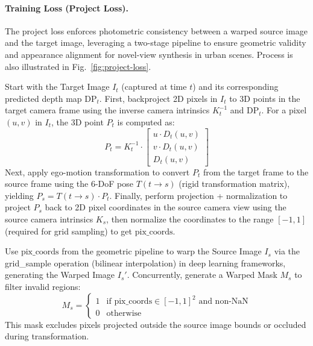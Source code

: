 \paragraph{Training Loss (Project Loss).}
The project loss enforces photometric consistency between a warped source image and the target image, leveraging a two-stage pipeline to ensure geometric validity and appearance alignment for novel-view synthesis in urban scenes. Process is also illustrated in Fig.~\ref{fig:project-loss}.

Start with the Target Image \( I_t \) (captured at time \( t \)) and its corresponding predicted depth map \( \text{DP}_t \). First, backproject 2D pixels in \( I_t \) to 3D points in the target camera frame using the inverse camera intrinsics \( K_t^{-1} \) and \( \text{DP}_t \). For a pixel \( (u, v) \) in \( I_t \), the 3D point \( P_t \) is computed as:
\[
P_t = K_t^{-1} \cdot \begin{bmatrix} u \cdot D_t(u, v) \\ v \cdot D_t(u, v) \\ D_t(u, v) \end{bmatrix}
\]
Next, apply ego-motion transformation to convert \( P_t \) from the target frame to the source frame using the 6-DoF pose \( T(t \to s) \) (rigid transformation matrix), yielding \( P_s = T(t \to s) \cdot P_t \). Finally, perform projection + normalization to project \( P_s \) back to 2D pixel coordinates in the source camera view using the source camera intrinsics \( K_s \), then normalize the coordinates to the range \([-1, 1]\) (required for grid sampling) to get \(\text{pix\_coords}\).

Use \(\text{pix\_coords}\) from the geometric pipeline to warp the Source Image \( I_s \) via the grid\_sample operation (bilinear interpolation) in deep learning frameworks, generating the Warped Image \( I_s' \). Concurrently, generate a Warped Mask \( M_s\) to filter invalid regions:
\[
M_s = \begin{cases} 
1 & \text{if } \text{pix\_coords} \in [-1, 1]^2 \text{ and non-NaN} \\
0 & \text{otherwise}
\end{cases}
\]
This mask excludes pixels projected outside the source image bounds or occluded during transformation.

